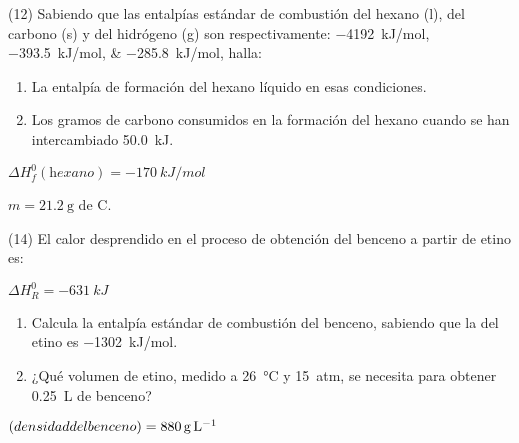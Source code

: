 \documentclass[10pt]{article}
\newenvironment{gexdatos}{
  \noindent\makebox[0pt][r]{\textit{Datos:}}
  }{\vspace{5pt}}
\begin{document}
\begin{multicols}{2}
\begin{exercise}[
    tags    = {},
    topics  = {química,química básica},
    source  = {FQ 1B MGH 2016, p85, e26},
  ]

  (12) Sabiendo que las entalpías estándar de combustión del
  hexano (l), del carbono (s) y del hidrógeno (g) son respectivamente:
  \SIlist{-4192;-393,5;-285,8}{kJ/mol}, halla:

  \begin{enumerate}
    \item La entalpía de formación del hexano líquido en esas condiciones.
    \item Los gramos de carbono consumidos en la formación del hexano cuando se han intercambiado \SI{50.0}{kJ}.

  \end{enumerate}
\end{exercise}

\begin{solution}
  \begin{enumerate*}
    \item \( \Delta H^0_f (\textit{hexano}) = \SI{-170}{kJ/mol} \) \item \( m = \SI{21.2}{\gram} \) de C.
  \end{enumerate*}
\end{solution}





\begin{exercise}[
    tags    = {},
    topics  = {química,química básica},
    source  = {FQ 1B MGH 2016, p85, e26},
  ]

  (14) El calor desprendido en el proceso de obtención del benceno a partir de etino es:

   \( \Delta H^0_R = \SI{-631}{kJ} \)

  \begin{enumerate}
    \item Calcula la entalpía estándar de combustión del benceno, sabiendo que la del etino es \SI{-1302}{kJ/mol}.
    \item ¿Qué volumen de etino, medido a \SI{26}{\celsius} y \SI{15}{atm}, se necesita para obtener \SI{0.25}{\liter} de benceno?
  \end{enumerate}

  \begin{gexdatos}
    \( \textrm(densidad del benceno) = \SI{880}{\gram\per\liter} \)
  \end{gexdatos}


\end{exercise}
\end{multicols}
\end{document}
